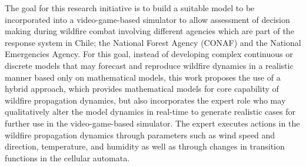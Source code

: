 \documentclass[conference]{IEEEtran}
\begin{document}
    The goal for this research initiative is to build a suitable model to be incorporated into a video-game-based 
    simulator to allow assessment of decision making during wildfire combat involving different agencies which are 
    part of the response system in Chile; the National Forest Agency (CONAF) and the National Emergencies Agency. 
    For this goal, instead of developing complex continuous or discrete models that may forecast and reproduce 
    wildfire dynamics in a realistic manner based only on mathematical models, this work proposes the use of a 
    hybrid approach, which provides mathematical models for core capability of wildfire propagation dynamics, 
    but also incorporates the expert role who may qualitatively alter the model dynamics in real-time to generate 
    realistic cases for further use in the video-game-based simulator. The expert executes actions in the wildfire 
    propagation dynamics through parameters such as wind speed and direction, temperature, and humidity as well as 
    through changes in transition functions in the cellular automata.



%
%
\end{document}
